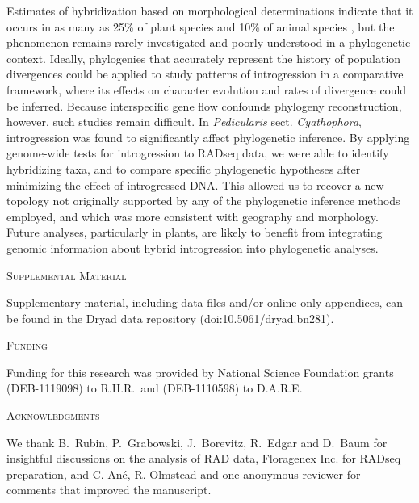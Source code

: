 \documentclass[12pt,letterpaper]{article}
\renewcommand{\section}[1]{%
\bigskip
\begin{center}
\begin{Large}
\normalfont\scshape #1
\medskip
\end{Large}
\end{center}}
\begin{document}
Estimates of hybridization based on morphological determinations
indicate that it occurs in as many as 25\% of plant species and 10\%
of animal species \citep{mallet_hybridization_2005}, but the
phenomenon remains rarely investigated and poorly understood in a
phylogenetic context. Ideally, phylogenies that accurately represent
the history of population divergences could be applied to study
patterns of introgression in a comparative framework, where its
effects on character evolution and rates of divergence could be
inferred. Because interspecific gene flow confounds phylogeny
reconstruction, however, such studies remain difficult.  In
\emph{Pedicularis} sect. \emph{Cyathophora}, introgression was found
to significantly affect phylogenetic inference.  By applying
genome-wide tests for introgression to RADseq data, we were able to
identify hybridizing taxa, and to compare specific phylogenetic
hypotheses after minimizing the effect of introgressed DNA.  This
allowed us to recover a new topology not originally supported by any
of the phylogenetic inference methods employed, and which was more
consistent with geography and morphology.  Future analyses,
particularly in plants, are likely to benefit from integrating genomic
information about hybrid introgression into phylogenetic analyses.

\section{Supplemental Material}
Supplementary material, including data files and/or online-only appendices, 
can be found in the Dryad data repository (doi:10.5061/dryad.bn281).

\section{Funding}
Funding for this research was provided by National Science Foundation grants
(DEB-1119098) to R.H.R.\ and (DEB-1110598) to D.A.R.E.

\section{Acknowledgments}
We thank B.~Rubin, P.~Grabowski, J.~Borevitz, R.~Edgar and D.~Baum
for insightful discussions on the analysis of RAD data,
Floragenex Inc. for RADseq preparation, and 
C. An\'e, R. Olmstead and one anonymous reviewer for comments that 
improved the manuscript.




\end{document}
